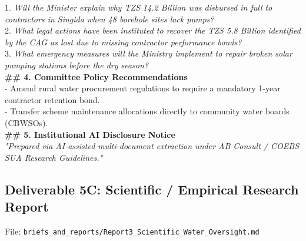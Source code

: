 \documentclass[11pt, a4paper]{report}
\begin{document}
\begin{tcolorbox}[colback=lightgrey, colframe=bordergrey, title=\textbf{Deliverable 5B Preview: \texttt{Report2\_Policy\_Brief\_Water\_Oversight.md}}]
1. \textit{Will the Minister explain why TZS 14.2 Billion was disbursed in full to contractors in Singida when 48 borehole sites lack pumps?}\\
2. \textit{What legal actions have been instituted to recover the TZS 5.8 Billion identified by the CAG as lost due to missing contractor performance bonds?}\\
3. \textit{What emergency measures will the Ministry implement to repair broken solar pumping stations before the dry season?}\\[0.2cm]
\textbf{\#\# 4. Committee Policy Recommendations}\\
- Amend rural water procurement regulations to require a mandatory 1-year contractor retention bond.\\
- Transfer scheme maintenance allocations directly to community water boards (CBWSOs).\\[0.2cm]
\textbf{\#\# 5. Institutional AI Disclosure Notice}\\
\textit{"Prepared via AI-assisted multi-document extraction under AB Consult / COEBS SUA Research Guidelines."}
\end{tcolorbox}

\newpage

\subsection{Deliverable 5C: Scientific / Empirical Research Report}
File: \texttt{briefs\_and\_reports/Report3\_Scientific\_Water\_Oversight.md}
\end{document}

